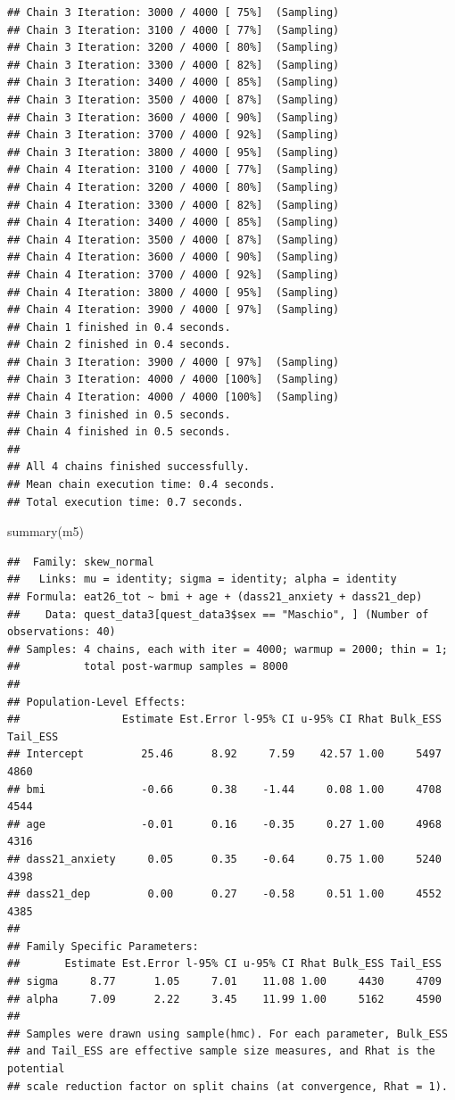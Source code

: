 \documentclass[
]{article}
\newenvironment{Shaded}{\begin{snugshade}}{\end{snugshade}}
\newcommand{\FunctionTok}[1]{\textcolor[rgb]{0.00,0.00,0.00}{#1}}
\newcommand{\NormalTok}[1]{#1}
\begin{document}
\begin{verbatim}
## Chain 3 Iteration: 3000 / 4000 [ 75%]  (Sampling) 
## Chain 3 Iteration: 3100 / 4000 [ 77%]  (Sampling) 
## Chain 3 Iteration: 3200 / 4000 [ 80%]  (Sampling) 
## Chain 3 Iteration: 3300 / 4000 [ 82%]  (Sampling) 
## Chain 3 Iteration: 3400 / 4000 [ 85%]  (Sampling) 
## Chain 3 Iteration: 3500 / 4000 [ 87%]  (Sampling) 
## Chain 3 Iteration: 3600 / 4000 [ 90%]  (Sampling) 
## Chain 3 Iteration: 3700 / 4000 [ 92%]  (Sampling) 
## Chain 3 Iteration: 3800 / 4000 [ 95%]  (Sampling) 
## Chain 4 Iteration: 3100 / 4000 [ 77%]  (Sampling) 
## Chain 4 Iteration: 3200 / 4000 [ 80%]  (Sampling) 
## Chain 4 Iteration: 3300 / 4000 [ 82%]  (Sampling) 
## Chain 4 Iteration: 3400 / 4000 [ 85%]  (Sampling) 
## Chain 4 Iteration: 3500 / 4000 [ 87%]  (Sampling) 
## Chain 4 Iteration: 3600 / 4000 [ 90%]  (Sampling) 
## Chain 4 Iteration: 3700 / 4000 [ 92%]  (Sampling) 
## Chain 4 Iteration: 3800 / 4000 [ 95%]  (Sampling) 
## Chain 4 Iteration: 3900 / 4000 [ 97%]  (Sampling) 
## Chain 1 finished in 0.4 seconds.
## Chain 2 finished in 0.4 seconds.
## Chain 3 Iteration: 3900 / 4000 [ 97%]  (Sampling) 
## Chain 3 Iteration: 4000 / 4000 [100%]  (Sampling) 
## Chain 4 Iteration: 4000 / 4000 [100%]  (Sampling) 
## Chain 3 finished in 0.5 seconds.
## Chain 4 finished in 0.5 seconds.
## 
## All 4 chains finished successfully.
## Mean chain execution time: 0.4 seconds.
## Total execution time: 0.7 seconds.
\end{verbatim}

\begin{Shaded}
\begin{Highlighting}[]
\FunctionTok{summary}\NormalTok{(m5)}
\end{Highlighting}
\end{Shaded}

\begin{verbatim}
##  Family: skew_normal 
##   Links: mu = identity; sigma = identity; alpha = identity 
## Formula: eat26_tot ~ bmi + age + (dass21_anxiety + dass21_dep) 
##    Data: quest_data3[quest_data3$sex == "Maschio", ] (Number of observations: 40) 
## Samples: 4 chains, each with iter = 4000; warmup = 2000; thin = 1;
##          total post-warmup samples = 8000
## 
## Population-Level Effects: 
##                Estimate Est.Error l-95% CI u-95% CI Rhat Bulk_ESS Tail_ESS
## Intercept         25.46      8.92     7.59    42.57 1.00     5497     4860
## bmi               -0.66      0.38    -1.44     0.08 1.00     4708     4544
## age               -0.01      0.16    -0.35     0.27 1.00     4968     4316
## dass21_anxiety     0.05      0.35    -0.64     0.75 1.00     5240     4398
## dass21_dep         0.00      0.27    -0.58     0.51 1.00     4552     4385
## 
## Family Specific Parameters: 
##       Estimate Est.Error l-95% CI u-95% CI Rhat Bulk_ESS Tail_ESS
## sigma     8.77      1.05     7.01    11.08 1.00     4430     4709
## alpha     7.09      2.22     3.45    11.99 1.00     5162     4590
## 
## Samples were drawn using sample(hmc). For each parameter, Bulk_ESS
## and Tail_ESS are effective sample size measures, and Rhat is the potential
## scale reduction factor on split chains (at convergence, Rhat = 1).
\end{verbatim}
\end{document}
